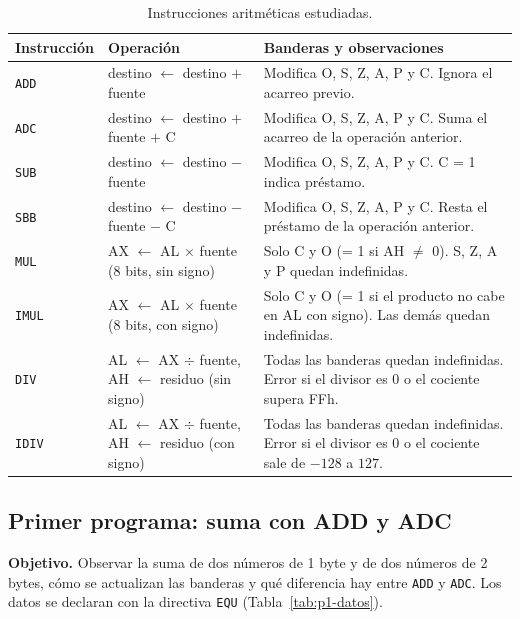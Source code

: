 \documentclass[10pt]{article}
\begin{document}
\begin{table}[htbp]
  \centering
  \caption{Instrucciones aritméticas estudiadas.}
  \label{tab:instrucciones}
  \begin{tabular}{|l|p{4.2cm}|p{5.6cm}|}
    \hline
    \textbf{Instrucción} & \textbf{Operación} & \textbf{Banderas y observaciones} \\
    \hline
    \texttt{ADD} & destino $\leftarrow$ destino $+$ fuente & Modifica O, S, Z, A, P y C. Ignora el acarreo previo. \\
    \hline
    \texttt{ADC} & destino $\leftarrow$ destino $+$ fuente $+$ C & Modifica O, S, Z, A, P y C. Suma el acarreo de la operación anterior. \\
    \hline
    \texttt{SUB} & destino $\leftarrow$ destino $-$ fuente & Modifica O, S, Z, A, P y C. C = 1 indica préstamo. \\
    \hline
    \texttt{SBB} & destino $\leftarrow$ destino $-$ fuente $-$ C & Modifica O, S, Z, A, P y C. Resta el préstamo de la operación anterior. \\
    \hline
    \texttt{MUL} & AX $\leftarrow$ AL $\times$ fuente (8 bits, sin signo) & Solo C y O (= 1 si AH $\neq$ 0). S, Z, A y P quedan indefinidas. \\
    \hline
    \texttt{IMUL} & AX $\leftarrow$ AL $\times$ fuente (8 bits, con signo) & Solo C y O (= 1 si el producto no cabe en AL con signo). Las demás quedan indefinidas. \\
    \hline
    \texttt{DIV} & AL $\leftarrow$ AX $\div$ fuente, AH $\leftarrow$ residuo (sin signo) & Todas las banderas quedan indefinidas. Error si el divisor es 0 o el cociente supera FFh. \\
    \hline
    \texttt{IDIV} & AL $\leftarrow$ AX $\div$ fuente, AH $\leftarrow$ residuo (con signo) & Todas las banderas quedan indefinidas. Error si el divisor es 0 o el cociente sale de $-128$ a $127$. \\
    \hline
  \end{tabular}
\end{table}
 
\subsection{Primer programa: suma con ADD y ADC}
 
\textbf{Objetivo.} Observar la suma de dos números de 1 byte y de dos números de 2 bytes, cómo se actualizan las banderas y qué diferencia hay entre \texttt{ADD} y \texttt{ADC}. Los datos se declaran con la directiva \texttt{EQU} (Tabla~\ref{tab:p1-datos}).
 
\end{document}
